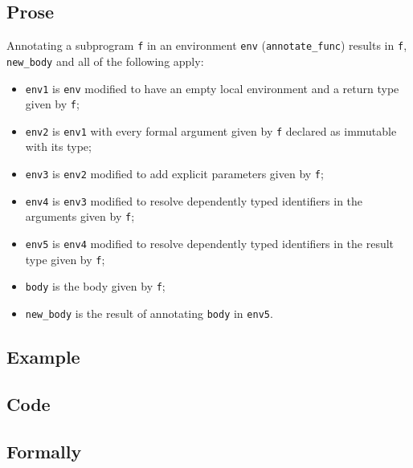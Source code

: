 \documentclass{book}
\begin{document}
  \subsection{Prose}
Annotating a subprogram \texttt{f} in an environment \texttt{env}
(\texttt{annotate\_func}) results in \texttt{f}, \texttt{new\_body} and all of
the following apply:
 \begin{itemize}
   \item \texttt{env1} is \texttt{env} modified to have an empty local
     environment and a return type given by \texttt{f};
   \item \texttt{env2} is \texttt{env1} with every formal argument given by
     \texttt{f} declared as immutable with its type;
   \item \texttt{env3} is \texttt{env2} modified to add explicit parameters
     given by \texttt{f};
   \item \texttt{env4} is \texttt{env3} modified to resolve dependently typed
     identifiers in the arguments given by \texttt{f};
   \item \texttt{env5} is \texttt{env4} modified to resolve dependently typed
     identifiers in the result type given by \texttt{f};
   \item \texttt{body} is the body given by \texttt{f};
   \item \texttt{new\_body} is the result of annotating \texttt{body} in
     \texttt{env5}.
 \end{itemize} 

  \subsection{Example}

  \subsection{Code}

\begin{emptyformal}
    \subsection{Formally}
\end{emptyformal}

\end{document}

